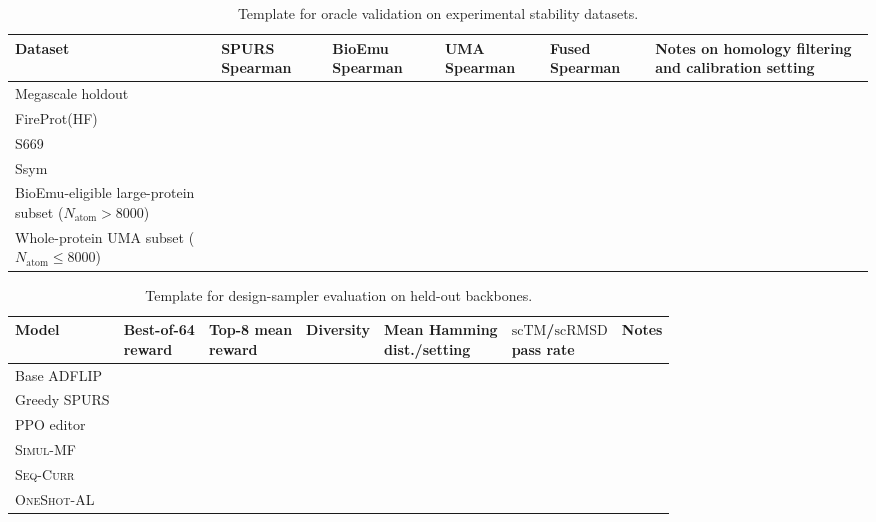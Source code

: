\documentclass[11pt]{article}
\newcommand{\scTM}{\ensuremath{\mathrm{scTM}}}
\newcommand{\scRMSD}{\ensuremath{\mathrm{scRMSD}}}
\newcommand{\methodI}{\textsc{Simul-MF}}
\newcommand{\methodII}{\textsc{Seq-Curr}}
\newcommand{\methodIII}{\textsc{OneShot-AL}}
\begin{document}
\begin{table}[H]
\centering
\caption{Template for oracle validation on experimental stability datasets.}
\begin{tabularx}{\textwidth}{>{\raggedright\arraybackslash}p{} >{\raggedright\arraybackslash}p{} >{\raggedright\arraybackslash}p{} >{\raggedright\arraybackslash}p{} >{\raggedright\arraybackslash}p{} >{\raggedright\arraybackslash}X}
\toprule
Dataset & SPURS Spearman & BioEmu Spearman & UMA Spearman & Fused Spearman & Notes on homology filtering and calibration setting \\
\midrule
Megascale holdout &  &  &  &  &  \\
FireProt(HF) &  &  &  &  &  \\
S669 &  &  &  &  &  \\
Ssym &  &  &  &  &  \\
BioEmu-eligible large-protein subset ($N_{\mathrm{atom}}>8000$) &  &  &  &  &  \\
Whole-protein UMA subset ($N_{\mathrm{atom}}\leq 8000$) &  &  &  &  &  \\
\bottomrule
\end{tabularx}
\end{table}

\begin{table}[H]
\centering
\small
\caption{Template for design-sampler evaluation on held-out backbones.}
\begin{tabularx}{\textwidth}{>{\raggedright\arraybackslash}p{} *{5}{>{\centering\arraybackslash}p{}} X}
\toprule
Model & \shortstack{Best-of-64\\reward} & \shortstack{Top-8 mean\\reward} & Diversity & \shortstack{Mean Hamming\\dist./setting} & \shortstack{\scTM/\scRMSD\\pass rate} & Notes \\
\midrule
Base ADFLIP &  &  &  &  &  &  \\
Greedy SPURS &  &  &  &  &  &  \\
PPO editor &  &  &  &  &  &  \\
\methodI{} &  &  &  &  &  &  \\
\methodII{} &  &  &  &  &  &  \\
\methodIII{} &  &  &  &  &  &  \\
\bottomrule
\end{tabularx}
\end{table}
\end{document}
